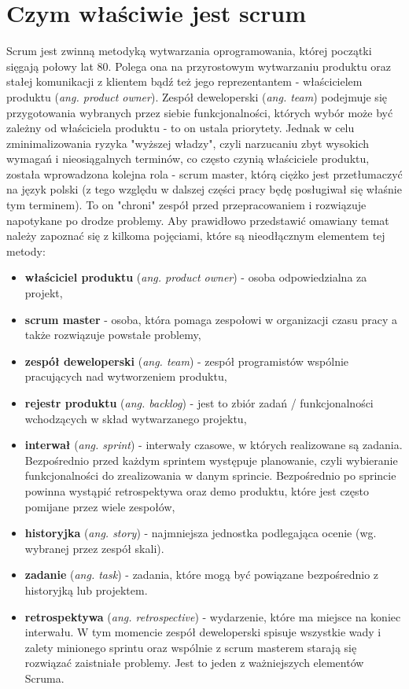 \section{Czym właściwie jest scrum}
Scrum jest zwinną metodyką wytwarzania oprogramowania, której początki sięgają połowy lat 80. Polega ona na przyrostowym wytwarzaniu produktu oraz stałej komunikacji z klientem bądź też jego reprezentantem - właścicielem produktu (\textit{ang. product owner}). Zespół deweloperski ({\textit{ang. team}}) podejmuje się przygotowania wybranych przez siebie funkcjonalności, których wybór może być zależny od właściciela produktu - to on ustala priorytety. Jednak w celu zminimalizowania ryzyka "wyższej władzy", czyli narzucaniu zbyt wysokich wymagań i nieosiągalnych terminów, co często czynią właściciele produktu, została wprowadzona kolejna rola - scrum master, którą ciężko jest przetłumaczyć na język polski (z tego względu w dalszej części pracy będę posługiwał się właśnie tym terminem). To on "chroni" zespół przed przepracowaniem i rozwiązuje napotykane po drodze problemy. Aby prawidłowo przedstawić omawiany temat należy zapoznać się z kilkoma pojęciami, które są nieodłącznym elementem tej metody:
\begin{itemize}
	\item \textbf{właściciel produktu} (\textit{ang. product owner}) - osoba odpowiedzialna za projekt,
	\item \textbf{scrum master} - osoba, która pomaga zespołowi w organizacji czasu pracy a także rozwiązuje powstałe problemy,
	\item \textbf{zespół deweloperski} (\textit{ang. team}) - zespół programistów wspólnie pracujących nad wytworzeniem produktu,
	\item \textbf{rejestr produktu} (\textit{ang. backlog}) - jest to zbiór zadań / funkcjonalności wchodzących w skład wytwarzanego projektu,
	\item \textbf{interwał} (\textit{ang. sprint}) - interwały czasowe, w których realizowane są zadania. Bezpośrednio przed każdym sprintem występuje planowanie, czyli wybieranie funkcjonalności do zrealizowania w danym sprincie. Bezpośrednio po sprincie powinna wystąpić retrospektywa oraz demo produktu, które jest często pomijane przez wiele zespołów,
	\item \textbf{historyjka} (\textit{ang. story}) - najmniejsza jednostka podlegająca ocenie (wg. wybranej przez zespół skali). 
	\item \textbf{zadanie} (\textit{ang. task}) - zadania, które mogą być powiązane bezpośrednio z historyjką lub projektem.
	\item \textbf{retrospektywa} (\textit{ang. retrospective}) - wydarzenie, które ma miejsce na koniec interwału. W tym momencie zespół deweloperski spisuje wszystkie wady i zalety minionego sprintu oraz wspólnie z scrum masterem starają się rozwiązać zaistniałe problemy. Jest to jeden z ważniejszych elementów Scruma.
\end{itemize} 

